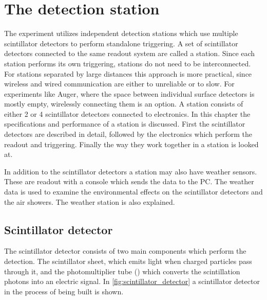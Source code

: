 \setcounter{chapter}{1}
\chapter{The \hisparc detection station}

The \hisparc experiment utilizes independent detection stations which use multiple scintillator detectors to perform standalone triggering. A set of scintillator detectors connected to the same readout system are called a station. Since each station performs its own triggering, stations do not need to be interconnected. For stations separated by large distances this approach is more practical, since wireless and wired communication are either to unreliable or to slow. For experiments like Auger, where the space between individual surface detectors is mostly empty, wirelessly connecting them is an option. A \hisparc station consists of either 2 or 4 scintillator detectors connected to \hisparc electronics. In this chapter the specifications and performance of a station is discussed. First the scintillator detectors are described in detail, followed by the electronics which perform the readout and triggering. Finally the way they work together in a station is looked at.

In addition to the scintillator detectors a station may also have weather sensors. These are readout with a console which sends the data to the PC. The weather data is used to examine the environmental effects on the scintillator detectors and the air showers. The weather station is also explained.


\section{Scintillator detector}

The scintillator detector consists of two main components which perform the detection. The scintillator sheet, which emits light when charged particles pass through it, and the photomultiplier tube (\pmt) which converts the scintillation photons into an electric signal. In \cref{fig:scintillator_detector} a scintillator detector in the process of being built is shown.

